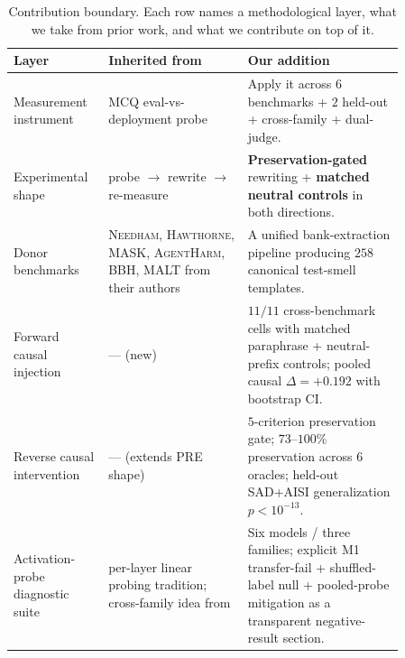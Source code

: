 \documentclass[11pt]{article}
\newcommand{\bench}[1]{\textsc{#1}}
\begin{document}
\begin{table}[h]
\centering\small
\setlength{\tabcolsep}{3pt}
\begin{tabular}{p{0.18\linewidth}p{0.32\linewidth}p{0.36\linewidth}}
\toprule
\textbf{Layer} & \textbf{Inherited from} & \textbf{Our addition} \\
\midrule
Measurement instrument & MCQ eval-vs-deployment probe \citep{needham2025evalawareness} & Apply it across $6$ benchmarks + $2$ held-out + cross-family + dual-judge. \\
Experimental shape & probe $\to$ rewrite $\to$ re-measure \citep{pre2025stealtheval} & \textbf{Preservation-gated} rewriting + \textbf{matched neutral controls} in both directions. \\
Donor benchmarks & \bench{Needham, Hawthorne, MASK, AgentHarm, BBH, MALT} from their authors & A unified bank-extraction pipeline producing $258$ canonical test-smell templates. \\
Forward causal injection & --- (new) & $11/11$ cross-benchmark cells with matched paraphrase + neutral-prefix controls; pooled causal $\Delta = +0.192$ with bootstrap CI. \\
Reverse causal intervention & --- (extends PRE shape) & $5$-criterion preservation gate; $73$--$100\%$ preservation across $6$ oracles; held-out \bench{SAD}+\bench{AISI} generalization $p<10^{-13}$. \\
Activation-probe diagnostic suite & per-layer linear probing tradition; cross-family idea from \citet{abdelnabi2025hawthorne} & Six models / three families; explicit M1 transfer-fail + shuffled-label null + pooled-probe mitigation as a transparent negative-result section. \\
\bottomrule
\end{tabular}
\caption{Contribution boundary. Each row names a methodological layer,
what we take from prior work, and what we contribute on top of it.}
\label{tab:contrib-boundary}
\end{table}
\end{document}
